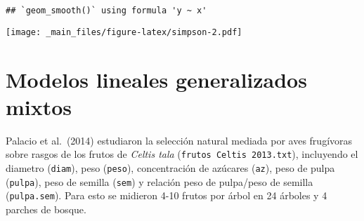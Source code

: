 \documentclass[
]{book}
\newenvironment{Shaded}{\begin{snugshade}}{\end{snugshade}}
\newcommand{\DataTypeTok}[1]{\textcolor[rgb]{0.13,0.29,0.53}{#1}}
\newcommand{\DecValTok}[1]{\textcolor[rgb]{0.00,0.00,0.81}{#1}}
\newcommand{\FloatTok}[1]{\textcolor[rgb]{0.00,0.00,0.81}{#1}}
\newcommand{\KeywordTok}[1]{\textcolor[rgb]{0.13,0.29,0.53}{\textbf{#1}}}
\newcommand{\NormalTok}[1]{#1}
\newcommand{\OperatorTok}[1]{\textcolor[rgb]{0.81,0.36,0.00}{\textbf{#1}}}
\newcommand{\OtherTok}[1]{\textcolor[rgb]{0.56,0.35,0.01}{#1}}
\newcommand{\StringTok}[1]{\textcolor[rgb]{0.31,0.60,0.02}{#1}}
\begin{document}
\begin{Shaded}
\end{Shaded}

\begin{verbatim}
## `geom_smooth()` using formula 'y ~ x'
\end{verbatim}

\texttt{[image: \_main\_files/figure-latex/simpson-2.pdf]}

\hypertarget{modelos-lineales-generalizados-mixtos}{%
\section{Modelos lineales generalizados mixtos}\label{modelos-lineales-generalizados-mixtos}}

Palacio et al.~(2014) estudiaron la selección natural mediada por aves frugívoras sobre rasgos de los frutos de \emph{Celtis tala} (\texttt{frutos\ Celtis\ 2013.txt}), incluyendo el diametro (\texttt{diam}), peso (\texttt{peso}), concentración de azúcares (\texttt{az}), peso de pulpa (\texttt{pulpa}), peso de semilla (\texttt{sem}) y relación peso de pulpa/peso de semilla (\texttt{pulpa.sem}). Para esto se midieron 4-10 frutos por árbol en 24 árboles y 4 parches de bosque.
\end{document}
